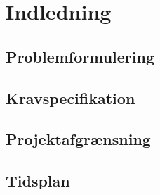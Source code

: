 \section{Indledning}
\subsection{Problemformulering}
\subsection{Kravspecifikation}
\subsection{Projektafgrænsning}
\subsection{Tidsplan}